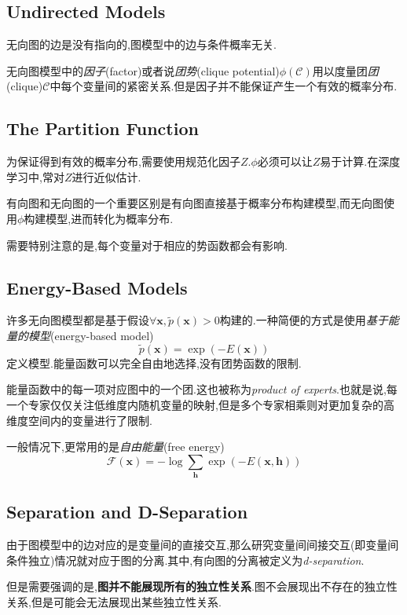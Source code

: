 \subsection{Undirected Models}

无向图的边是没有指向的,图模型中的边与条件概率无关.

无向图模型中的\textit{因子}(factor)或者说\textit{团势}(clique potential)$\phi(\mathcal C)$用以度量团\textit{团}(clique)$\mathcal C$中每个变量间的紧密关系.但是因子并不能保证产生一个有效的概率分布.

\subsection{The Partition Function}

为保证得到有效的概率分布,需要使用规范化因子$Z$.$\phi$必须可以让$Z$易于计算.在深度学习中,常对$Z$进行近似估计.

有向图和无向图的一个重要区别是有向图直接基于概率分布构建模型,而无向图使用$\phi$构建模型,进而转化为概率分布.

需要特别注意的是,每个变量对于相应的势函数都会有影响.

\subsection{Energy-Based Models}

许多无向图模型都是基于假设$\forall\mathbf x,\tilde p(\mathbf x)>0$构建的.一种简便的方式是使用\textit{基于能量的模型}(energy-based model)
\begin{equation}
\tilde p(\mathbf x)=\exp(-E(\mathbf x))
\end{equation}
定义模型.能量函数可以完全自由地选择,没有团势函数的限制.

能量函数中的每一项对应图中的一个团.这也被称为\textit{product of experts}.也就是说,每一个专家仅仅关注低维度内随机变量的映射,但是多个专家相乘则对更加复杂的高维度空间内的变量进行了限制.

一般情况下,更常用的是\textit{自由能量}(free energy)
\begin{equation}
\mathcal F(\mathbf x)=-\log\sum_{\mathbf h}\exp(-E(\mathbf{x,h}))
\end{equation}

\subsection{Separation and D-Separation}

由于图模型中的边对应的是变量间的直接交互,那么研究变量间间接交互(即变量间条件独立)情况就对应于图的分离.其中,有向图的分离被定义为\textit{d-separation}.

但是需要强调的是,\textbf{图并不能展现所有的独立性关系}.图不会展现出不存在的独立性关系,但是可能会无法展现出某些独立性关系.